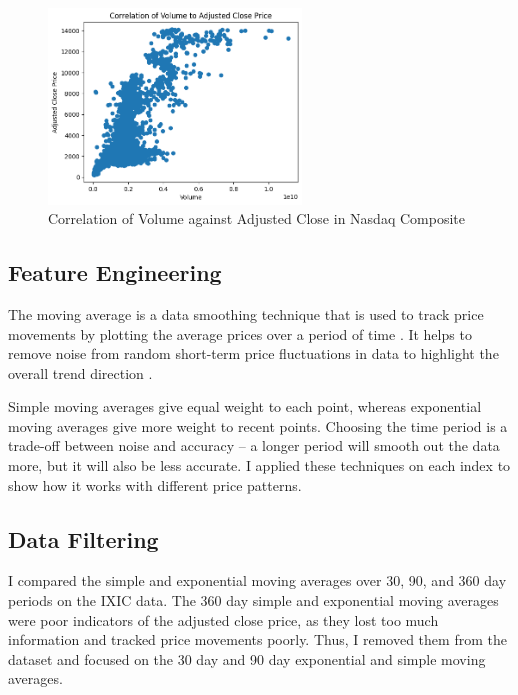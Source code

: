 \documentclass[a4paper, 11pt]{article}
\begin{document}
\begin{figure}[H]
    \begin{center}
        \includegraphics[width=0.6\textwidth]{Correlation of Volume to Adjusted Close Price.png}
        \caption{Correlation of Volume against Adjusted Close in Nasdaq Composite}
    \end{center}
\end{figure}


\subsection{Feature Engineering}
The moving average is a data smoothing technique that is used to track price movements by plotting the average prices over a period of time \cite{movingAverageChart}. It helps to  remove noise from random short-term price fluctuations in data to highlight the overall trend direction \cite{movingAverageChart}.

Simple moving averages give equal weight to each point, whereas exponential moving averages give more weight to recent points. Choosing the time period is a trade-off between noise and accuracy -- a longer period will smooth out the data more, but it will also be less accurate. I applied these techniques on each index to show how it works with different price patterns.

\subsection{Data Filtering}
I compared the simple and exponential moving averages over 30, 90, and 360 day periods on the IXIC data. The 360 day simple and exponential moving averages were poor indicators of the adjusted close price, as they lost too much information and tracked price movements poorly. Thus, I removed them from the dataset and focused on the 30 day and 90 day exponential and simple moving averages.
\end{document}

